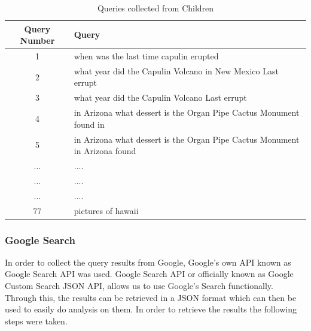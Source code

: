 \documentclass[50pt]{usiinfbachelorproject}
\begin{document}
\noindent
\begin{table}[H]
  \centering
  \begin{tabular}{|c|l|}
    \hline
    Query Number & Query \\
    \hline
    \hline
    1 & when was the last time capulin erupted \\
    \hline
    2 & what year did the Capulin Volcano in New Mexico Last errupt \\
    \hline
    3 & what year did the Capulin Volcano Last errupt \\
    \hline
    4 & in Arizona what dessert is the Organ Pipe Cactus Monument found in \\
    \hline
    5 & in Arizona what dessert is the Organ Pipe Cactus Monument in Arizona found \\
    \hline
    ... & .... \\
    \hline
    ... & .... \\
    \hline
    ... & .... \\
    \hline
    77 & pictures of hawaii\\
    \hline
  \end{tabular}
  \caption{Queries collected from Children}
  \label{tab:example}
\end{table}

\subsubsection{Google Search}
In order to collect the query results from Google, Google’s own API known as Google Search API was used. Google Search API or officially known as Google Custom Search JSON API, allows us to use Google’s Search functionally. Through this, the results can be retrieved in a JSON format which can then be used to easily do analysis on them. In order to retrieve the results the following steps were taken.
\end{document}

